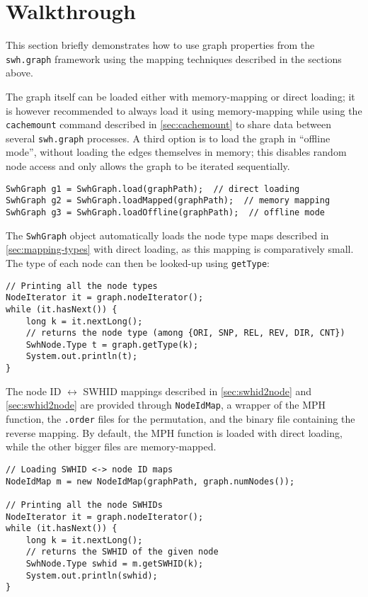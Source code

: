 \section{Walkthrough}

This section briefly demonstrates how to use graph properties from the
\texttt{swh.graph} framework using the mapping techniques described in the
sections above.

The graph itself can be loaded either with memory-mapping or direct loading; it
is however recommended to always load it using memory-mapping while using the
\texttt{cachemount} command described in \cref{sec:cachemount} to share data
between several \texttt{swh.graph} processes. A third option is to load the
graph in ``offline mode'', without loading the edges themselves in memory; this
disables random node access and only allows the graph to be iterated
sequentially.

\begin{verbatim}
SwhGraph g1 = SwhGraph.load(graphPath);  // direct loading
SwhGraph g2 = SwhGraph.loadMapped(graphPath);  // memory mapping
SwhGraph g3 = SwhGraph.loadOffline(graphPath);  // offline mode
\end{verbatim}

The \texttt{SwhGraph} object automatically loads the node type maps described
in \cref{sec:mapping-types} with direct loading, as this mapping is
comparatively small. The type of each node can then be looked-up using
\texttt{getType}:

\begin{verbatim}
// Printing all the node types
NodeIterator it = graph.nodeIterator();
while (it.hasNext()) {
    long k = it.nextLong();
    // returns the node type (among {ORI, SNP, REL, REV, DIR, CNT})
    SwhNode.Type t = graph.getType(k);
    System.out.println(t);
}
\end{verbatim}

The node ID $\leftrightarrow$ \gls{SWHID} mappings described in
\cref{sec:swhid2node} and \cref{sec:swhid2node} are provided through
\texttt{NodeIdMap}, a wrapper of the \gls{MPH} function, the \texttt{.order}
files for the permutation, and the binary file containing the reverse mapping.
By default, the \gls{MPH} function is loaded with direct loading, while the
other bigger files are memory-mapped.

\begin{verbatim}
// Loading SWHID <-> node ID maps
NodeIdMap m = new NodeIdMap(graphPath, graph.numNodes());

// Printing all the node SWHIDs
NodeIterator it = graph.nodeIterator();
while (it.hasNext()) {
    long k = it.nextLong();
    // returns the SWHID of the given node
    SwhNode.Type swhid = m.getSWHID(k);
    System.out.println(swhid);
}
\end{verbatim}

